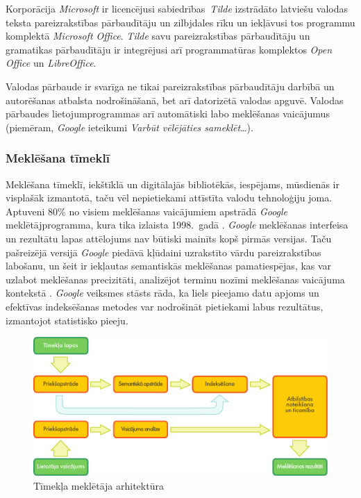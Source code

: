 \begin{multicols}{2}
Korporācija \textit{Microsoft} ir licencējusi sabiedrības~\textit{Tilde} izstrādāto latviešu valodas teksta pareizrakstības pārbaudītāju un zilbjdales rīku un iekļāvusi tos programmu komplektā \textit{Microsoft Office}.
\textit{Tilde} savu pareizrakstības pārbaudītāju un gramatikas pārbaudītāju ir integrējusi arī programmatūras komplektos \textit{Open Office }un\textit{ LibreOffice}.

Valodas pārbaude ir svarīga ne tikai pareizrakstības pārbaudītāju darbībā un autorēšanas atbalsta nodrošināšanā, bet arī datorizētā valodas apguvē.
Valodas pārbaudes lietojumprogrammas arī automātiski labo meklēšanas vaicājumus (piemēram, \textit{Google} ieteikumi \textit{Varbūt vēlējāties sameklēt}\dots). 

\subsubsection{Meklēšana tīmeklī}

Meklēšana tīmeklī, iekštīklā un digitālajās bibliotēkās, iespējams, mūsdienās ir visplašāk izmantotā, taču vēl nepietiekami attīstīta valodu tehnoloģiju joma.
Aptuveni 80\% no visiem meklēšanas vaicājumiem apstrādā\textit{ Google} meklētājprogramma, kura tika izlaista 1998.~gadā \cite{Meta16}.
\textit{Google} meklēšanas interfeisa un rezultātu lapas attēlojums nav būtiski mainīts kopš pirmās versijas.
Taču pašreizējā versijā \textit{Google} piedāvā kļūdaini uzrakstīto vārdu pareizrakstības labošanu, un šeit ir iekļautas semantiskās meklēšanas pamatiespējas, kas var uzlabot meklēšanas precizitāti, analizējot terminu nozīmi meklēšanas vaicājuma kontekstā \cite{Meta17}. 
\textit{Google} veiksmes stāsts rāda, ka liels pieejamo datu apjoms un efektīvas indeksēšanas metodes var nodrošināt pietiekami labus rezultātus, izmantojot statistisko pieeju.

\begin{figure}[htb]
  \center
  \includegraphics[width=\textwidth]{../_media/latvian/web_search_architecture}
  \caption{Tīmekļa meklētāja arhitektūra}
  \label{fig:websearcharch_de}
\end{figure}


\end{multicols}
